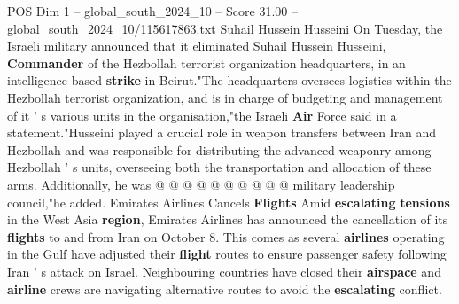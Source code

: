 \begin{textsample}{POS Dim 1 – global\_south\_2024\_10 – Score 31.00 – global\_south\_2024\_10/115617863.txt}
Suhail Hussein Husseini On Tuesday, the Israeli military announced that it eliminated Suhail Hussein Husseini, \textbf{Commander} of the Hezbollah terrorist organization headquarters, in an intelligence-based \textbf{strike} in Beirut."The headquarters oversees logistics within the Hezbollah terrorist organization, and is in charge of budgeting and management of it ' s various units in the organisation,"the Israeli \textbf{Air} Force said in a statement."Husseini played a crucial role in weapon transfers between Iran and Hezbollah and was responsible for distributing the advanced weaponry among Hezbollah ' s units, overseeing both the transportation and allocation of these arms.
Additionally, he was @ @ @ @ @ @ @ @ @ @ military leadership council,"he added.
Emirates Airlines Cancels \textbf{Flights} Amid \textbf{escalating} \textbf{tensions} in the West Asia \textbf{region}, Emirates Airlines has announced the cancellation of its \textbf{flights} to and from Iran on October 8.
This comes as several \textbf{airlines} operating in the Gulf have adjusted their \textbf{flight} routes to ensure passenger safety following Iran ' s attack on Israel.
Neighbouring countries have closed their \textbf{airspace} and \textbf{airline} crews are navigating alternative routes to avoid the \textbf{escalating} conflict.

\end{textsample}
